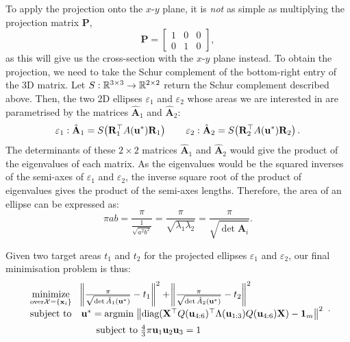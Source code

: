 \documentclass{article}
\begin{document}
To apply the projection onto the $x$-$y$ plane, it is \textit{not} as simple as multiplying the projection matrix $\mathbf P$,
\begin{equation}
    \mathbf P = \begin{bmatrix}
        1 & 0 & 0\\
        0 & 1 & 0
    \end{bmatrix},
\end{equation}
as this will give us the cross-section with the $x$-$y$ plane instead. To obtain the projection, we need to take the Schur complement of the bottom-right entry of the 3D matrix. Let $S: \R^{3\times 3} \to \R^{2\times 2}$ return the Schur complement described above. Then, the two 2D ellipses $\varepsilon_1$ and $\varepsilon_2$ whose areas we are interested in are parametrised by the matrices $\hat{\mathbf A}_1$ and $\hat{\mathbf A}_2$:
\begin{align}
    \varepsilon_1:\hat{\mathbf A}_1= S\lr(){ \mathbf{R}_1^\top A(\mathbf u^*) \mathbf{R}_1} \qquad \varepsilon_2: \hat{\mathbf A}_2 = S\lr() {\mathbf{R}_2^\top A(\mathbf u^*) \mathbf{R}_2}.
\end{align}
The determinants of these $2\times 2$ matrices  $\hat{\mathbf A}_1$ and $\hat{\mathbf A}_2$ would give the product of the eigenvalues of each matrix. As the eigenvalues would be the squared inverses of the semi-axes of $\varepsilon_1$ and $\varepsilon_2$, the inverse square root of the product of eigenvalues gives the product of the semi-axes lengths. Therefore, the area of an ellipse can be expressed as:
\begin{equation}
    \pi ab = \frac{\pi }{\frac{1}{\sqrt{a^2b^2}}}= \frac{\pi }{\sqrt{\lambda _1 \lambda _2}} = \frac{\pi}{\sqrt{\det{\hat{\mathbf A}_i}}}.
\end{equation}

Given two target areas $t_1$ and $t_2$ for the projected ellipses $\varepsilon_1$ and $\varepsilon_2$, our final minimisation problem is thus:
$$
\begin{array}{ll}
    \underset{\text{over} \mathcal X = \{ \mathbf x_i \}}{\text{minimize}} &  \lr\Vert\Vert { \frac{\pi}{\sqrt{\det \hat{A}_1(\mathbf u^*)}} - t_1} ^2 + \lr\Vert\Vert{ \frac{\pi}{\sqrt{\det \hat{A}_2(\mathbf u^*)}} - t_2} ^2  \\[0.5em]
  \text{subject to} & \mathbf u^* = \text{argmin} \; \lr\Vert\Vert {\text{diag}(\mathbf X^\top Q(\mathbf u_{4:6}) ^\top \Lambda(\mathbf u_{1:3}) Q(\mathbf u_{4:6}) \mathbf X) - \mathbf 1_m} ^2 \\[0.5em]
  & \hphantom{y =} \text{subject to} \;  \frac{4}{3} \pi \mathbf u_1 \mathbf u_2 \mathbf u_3 = 1
\end{array}.
$$
\end{document}
